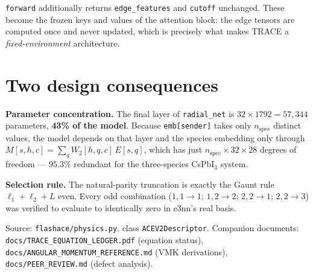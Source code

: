 \documentclass[11pt,a4paper]{article}
\newcommand{\code}[1]{\texttt{\small #1}}
\begin{document}
\code{forward} additionally returns \code{edge\_features} and \code{cutoff}
unchanged. These become the frozen keys and values of the attention block: the
edge tensors are computed once and never updated, which is precisely what makes
TRACE a \emph{fixed-environment} architecture.

\section{Two design consequences}

\textbf{Parameter concentration.} The final layer of \code{radial\_net} is
$32\times1792 = 57{,}344$ parameters, \textbf{43\% of the model}. Because
\code{emb[sender]} takes only $n_{\mathrm{spec}}$ distinct values, the model
depends on that layer and the species embedding only through
$M[s,h,c] = \sum_q W_2[h,q,c]\,E[s,q]$, which has just
$n_{\mathrm{spec}}\times32\times28$ degrees of freedom --- $95.3\%$ redundant for
the three-species CsPbI$_3$ system.

\textbf{Selection rule.} The natural-parity truncation is exactly the Gaunt rule
$\ell_1+\ell_2+L$ even. Every odd combination
($1,1\!\to\!1$; $1,2\!\to\!2$; $2,2\!\to\!1$; $2,2\!\to\!3$) was verified to
evaluate to identically zero in e3nn's real basis.

\vfill
\begin{center}\footnotesize\color{black!60}
Source: \code{flashace/physics.py}, class \code{ACEV2Descriptor}.
Companion documents: \code{docs/TRACE\_EQUATION\_LEDGER.pdf} (equation status),
\code{docs/ANGULAR\_MOMENTUM\_REFERENCE.md} (VMK derivations),
\code{docs/PEER\_REVIEW.md} (defect analysis).
\end{center}
\end{document}
